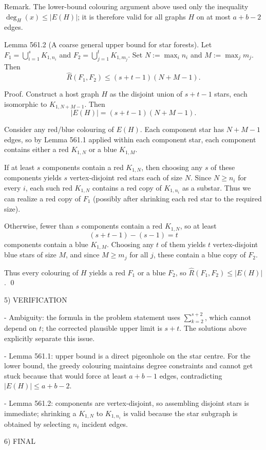 Remark.
The lower-bound colouring argument above used only the inequality $\deg_H(x)\le |E(H)|$; it is therefore valid for all graphs $H$ on at most $a+b-2$ edges.

Lemma 561.2 (A coarse general upper bound for star forests).
Let $F_1=\bigcup_{i=1}^s K_{1,n_i}$ and $F_2=\bigcup_{j=1}^t K_{1,m_j}$.
Set $N:=\max_i n_i$ and $M:=\max_j m_j$.
Then
\[
\hat{R}(F_1,F_2)\le (s+t-1)(N+M-1).
\]

Proof.
Construct a host graph $H$ as the disjoint union of $s+t-1$ stars, each isomorphic to $K_{1,N+M-1}$.
Then
\[
|E(H)|=(s+t-1)(N+M-1).
\]

Consider any red/blue colouring of $E(H)$.
Each component star has $N+M-1$ edges, so by Lemma 561.1 applied within each component star, each component contains either a red $K_{1,N}$ or a blue $K_{1,M}$.

If at least $s$ components contain a red $K_{1,N}$, then choosing any $s$ of these components yields $s$ vertex-disjoint red stars each of size $N$.
Since $N\ge n_i$ for every $i$, each such red $K_{1,N}$ contains a red copy of $K_{1,n_i}$ as a substar.
Thus we can realize a red copy of $F_1$ (possibly after shrinking each red star to the required size).

Otherwise, fewer than $s$ components contain a red $K_{1,N}$, so at least
\[
(s+t-1)-(s-1)=t
\]
components contain a blue $K_{1,M}$.
Choosing any $t$ of them yields $t$ vertex-disjoint blue stars of size $M$, and since $M\ge m_j$ for all $j$, these contain a blue copy of $F_2$.

Thus every colouring of $H$ yields a red $F_1$ or a blue $F_2$, so $\hat{R}(F_1,F_2)\le |E(H)|$.
\qed

5) VERIFICATION

- Ambiguity: the formula in the problem statement uses $\sum_{k=2}^{s+2}$, which cannot depend on $t$; the corrected plausible upper limit is $s+t$. The solutions above explicitly separate this issue.

- Lemma 561.1: upper bound is a direct pigeonhole on the star centre.
For the lower bound, the greedy colouring maintains degree constraints and cannot get stuck because that would force at least $a+b-1$ edges, contradicting $|E(H)|\le a+b-2$.

- Lemma 561.2: components are vertex-disjoint, so assembling disjoint stars is immediate; shrinking a $K_{1,N}$ to $K_{1,n_i}$ is valid because the star subgraph is obtained by selecting $n_i$ incident edges.

6) FINAL

